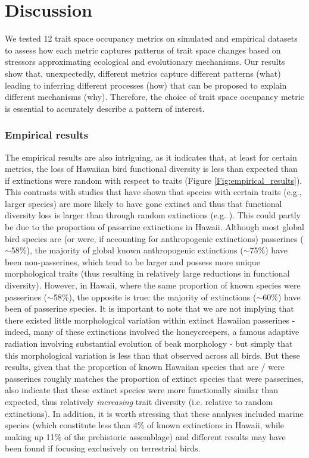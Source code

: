 \documentclass[12pt,letterpaper]{article}
\begin{document}
\section{Discussion}


We tested 12 trait space occupancy metrics on simulated and empirical datasets to assess how each metric captures patterns of trait space changes based on stressors approximating ecological and evolutionary mechanisms.
Our results show that, unexpectedly, different metrics capture different patterns (what) leading to inferring different processes (how) that can be proposed to explain different mechanisms (why).
Therefore, the choice of trait space occupancy metric is essential to accurately describe a pattern of interest.

\subsubsection{Empirical results}

The empirical results are also intriguing, as it indicates that, at least for certain metrics, the loss of Hawaiian bird functional diversity is less than expected than if extinctions were random with respect to traits (Figure \ref{Fig:empirical_results}).
This contrasts with studies that have shown that species with certain traits (e.g., larger species) are more likely to have gone extinct and thus that functional diversity loss is larger than through random extinctions (e.g. \citealt{sayol2021loss,Matthews2022}).
This could partly be due to the proportion of passerine extinctions in Hawaii.
Although most global bird species are (or were, if accounting for anthropogenic extinctions) passerines ($\sim$58\%), the majority of global known anthropogenic extinctions ($\sim$75\%) have been non-passerines, which tend to be larger and possess more unique morphological traits (thus resulting in relatively large reductions in functional diversity).
However, in Hawaii, where the same proportion of known species were passerines ($\sim$58\%), the opposite is true: the majority of extinctions ($\sim$60\%) have been of passerine species.
It is important to note that we are not implying that there existed little morphological variation within extinct Hawaiian passerines - indeed, many of these extinctions involved the honeycreepers, a famous adaptive radiation involving substantial evolution of beak morphology \citep{Walther2022} - but simply that this morphological variation is less than that observed across all birds.
But these results, given that the proportion of known Hawaiian species that are / were passerines roughly matches the proportion of extinct species that were passerines,  also indicate that these extinct species were more functionally similar than expected, thus relatively \textit{increasing} trait diversity (i.e. relative to random extinctions).
In addition, it is worth stressing that these analyses included marine species (which constitute less than 4\% of  known extinctions in Hawaii, while making up 11\% of the prehistoric assemblage) and different results may have been found if focusing exclusively on terrestrial birds.
\end{document}
